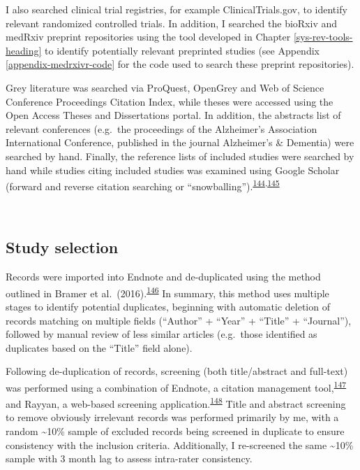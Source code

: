 \documentclass[a4paper, twoside]{templates/ociamthesis}
\begin{document}
I also searched clinical trial registries, for example ClinicalTrials.gov, to identify relevant randomized controlled trials. In addition, I searched the bioRxiv and medRxiv preprint repositories using the tool developed in Chapter \ref{sys-rev-tools-heading} to identify potentially relevant preprinted studies (see Appendix \ref{appendix-medrxivr-code} for the code used to search these preprint repositories).

Grey literature was searched via ProQuest, OpenGrey and Web of Science Conference Proceedings Citation Index, while theses were accessed using the Open Access Theses and Dissertations portal. In addition, the abstracts list of relevant conferences (e.g.~the proceedings of the Alzheimer's Association International Conference, published in the journal Alzheimer's \& Dementia) were searched by hand. Finally, the reference lists of included studies were searched by hand while studies citing included studies was examined using Google Scholar (forward and reverse citation searching or ``snowballing'').\textsuperscript{\protect\hyperlink{ref-greenhalgh2005}{144},\protect\hyperlink{ref-wohlin2014}{145}}

~

\hypertarget{study-selection}{%
\subsection{Study selection}\label{study-selection}}

Records were imported into Endnote and de-duplicated using the method outlined in Bramer et al.~(2016).\textsuperscript{\protect\hyperlink{ref-bramer2016}{146}} In summary, this method uses multiple stages to identify potential duplicates, beginning with automatic deletion of records matching on multiple fields (``Author'' + ``Year'' + ``Title'' + ``Journal''), followed by manual review of less similar articles (e.g.~those identified as duplicates based on the ``Title'' field alone).

Following de-duplication of records, screening (both title/abstract and full-text) was performed using a combination of Endnote, a citation management tool,\textsuperscript{\protect\hyperlink{ref-hupe2019}{147}} and Rayyan, a web-based screening application.\textsuperscript{\protect\hyperlink{ref-ouzzani2016}{148}} Title and abstract screening to remove obviously irrelevant records was performed primarily by me, with a random \textasciitilde10\% sample of excluded records being screened in duplicate to ensure consistency with the inclusion criteria. Additionally, I re-screened the same \textasciitilde10\% sample with 3 month lag to assess intra-rater consistency.
\end{document}
